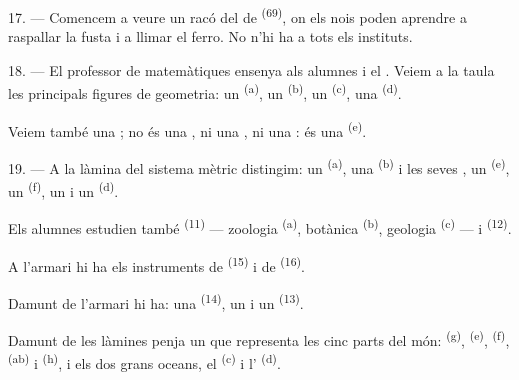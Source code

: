17. --- Comencem a veure un racó del  de  \textsuperscript{(69)}, on els nois poden aprendre a raspallar la fusta
i a llimar el ferro. No n'hi ha a tots els instituts.

\VUsaut{5.0mm}
\VUsaut{3.6mm}

18. --- El professor de matemàtiques ensenya als alumnes  i el . Veiem a la taula les principals
figures de geometria: un  \textsuperscript{(a)}, un
 \textsuperscript{(b)}, un 
\textsuperscript{(c)}, una  \textsuperscript{(d)}.

Veiem també una ; no és una , ni una
, ni una : és una 
\textsuperscript{(e)}.

19. --- A la làmina del sistema mètric distingim: un 
\textsuperscript{(a)}, una  \textsuperscript{(b)} i les seves
, un  \textsuperscript{(e)}, un 
\textsuperscript{(f)}, un  i un 
\textsuperscript{(d)}.

Els alumnes estudien també  \textsuperscript{(11)} ---
zoologia \textsuperscript{(a)}, botànica \textsuperscript{(b)}, geologia
\textsuperscript{(c)} --- i  \textsuperscript{(12)}.

A l'armari hi ha els instruments de  \textsuperscript{(15)} i de
 \textsuperscript{(16)}.

Damunt de l'armari hi ha: una  \textsuperscript{(14)}, un
 i un  \textsuperscript{(13)}.

Damunt de les làmines penja un  que representa les cinc parts del
món:  \textsuperscript{(g)}, 
\textsuperscript{(e)},  \textsuperscript{(f)},
 \textsuperscript{(ab)} i 
\textsuperscript{(h)}, i els dos grans oceans, el 
\textsuperscript{(c)} i l' \textsuperscript{(d)}.
\VUsaut{6.0mm}
\VUfilet{22mm}
